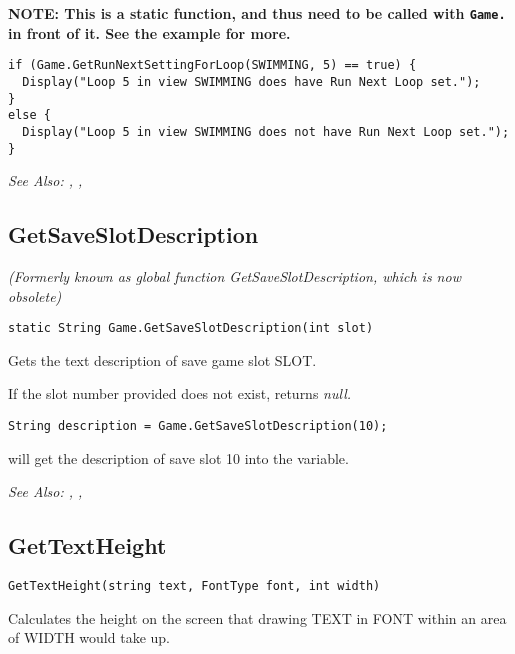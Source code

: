 \bf{NOTE:} This is a static function, and thus need to be called with \verb$Game.$ in front of it. See
the example for more.

\begin{verbatim}
if (Game.GetRunNextSettingForLoop(SWIMMING, 5) == true) {
  Display("Loop 5 in view SWIMMING does have Run Next Loop set.");
}
else {
  Display("Loop 5 in view SWIMMING does not have Run Next Loop set.");
}
\end{verbatim}

\it{See Also:} ,
,


\subsection{GetSaveSlotDescription}\label{Game.GetSaveSlotDescription}%

\it{(Formerly known as global function GetSaveSlotDescription, which is now obsolete)}

\begin{verbatim}
static String Game.GetSaveSlotDescription(int slot)
\end{verbatim}
Gets the text description of save game slot SLOT.

If the slot number provided does not exist, returns \it{null}.

\begin{verbatim}
String description = Game.GetSaveSlotDescription(10);
\end{verbatim}
will get the description of save slot 10 into the variable.

\it{See Also:} ,
, 


\subsection{GetTextHeight}\label{GetTextHeight}%

\begin{verbatim}
GetTextHeight(string text, FontType font, int width)
\end{verbatim}
Calculates the height on the screen that drawing TEXT in FONT within an area of WIDTH
would take up.

